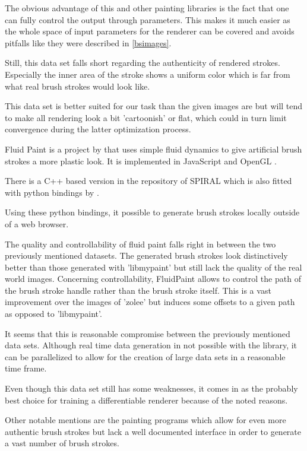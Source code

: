 The obvious advantage of this and other painting libraries is the fact that one
can fully control the output through parameters.
This makes it much easier as the whole space of input parameters for the renderer
can be covered and avoids pitfalls like they were described in \ref{bsimages}.

Still, this data set falls short regarding the authenticity of rendered strokes.
Especially the inner area of the stroke shows a uniform color which is far from
what real brush strokes would look like.

This data set is better suited for our task than the given images are but will tend
to make all rendering look a bit 'cartoonish' or flat, which could in turn limit
convergence during the latter optimization process.


Fluid Paint  is a project by  that uses simple
fluid dynamics to give artificial brush strokes a more plastic look.
It is implemented in JavaScript and OpenGL .

There is a C++ based version in the repository of SPIRAL which is also fitted with
python bindings by .

Using these python bindings, it possible to generate brush strokes locally outside
of a web browser.

The quality and controllability of fluid paint falls right in between the two previously
mentioned datasets.
The generated brush strokes look distinctively better than those generated with 'libmypaint'
but still lack the quality of the real world images.
Concerning controllability, FluidPaint allows to control the path of the brush stroke
handle rather than the brush stroke itself.
This is a vast improvement over the images of 'zolee' but induces some offsets to
a given path as opposed to 'libmypaint'.

It seems that this is reasonable compromise between the previously mentioned data sets.
Although real time data generation in not possible with the library, it can be parallelized
to allow for the creation of large data sets in a reasonable time frame.

Even though this data set still has some weaknesses, it comes in as the probably best
choice for training a differentiable renderer because of the noted reasons.

Other notable mentions are the painting programs 
which allow for even more authentic brush strokes but lack a well documented interface
in order to generate a vast number of brush strokes.


